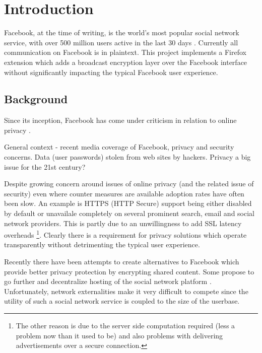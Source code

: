 \chapter{Introduction}\label{ch:introduction}

Facebook, at the time of writing, is the world's most popular social network service, with over 500 million users active in the last 30 days \cite{fb-factsheet}. Currently all communication on Facebook is in plaintext. This project implements a Firefox extension which adds a broadcast encryption layer over the Facebook interface without significantly impacting the typical Facebook user experience.

\section{Background}

Since its inception, Facebook has come under criticism in relation to online privacy \cite{fb-cipc}.

General context - recent media coverage of Facebook, privacy and security concerns. Data (user passwords) stolen from web sites by hackers. Privacy a big issue for the 21st century?
  

Despite growing concern around issues of online privacy (and the related issue of security) even where counter measures are available adoption rates have often been slow. An example is HTTPS (HTTP Secure) support being either disabled by default or unavailale completely on several prominent search, email and social network providers. This is partly due to an unwillingness to add SSL latency overheads \footnote{The other reason is due to the server side computation required (less a problem now than it used to be) and also problems with delivering advertisements over a secure connection.}. Clearly there is a requirement for privacy solutions which operate transparently without detrimenting the typical user experience.
  
Recently there have been attempts to create alternatives to Facebook \cite{pidder} which provide better privacy protection by encrypting shared content. Some propose to go further and decentralize hosting of the social network platform \cite{diaspora}. Unfortunately, network externalities make it very difficult to compete \cite{fb-network} since the utility of such a social network service is coupled to the size of the userbase.

